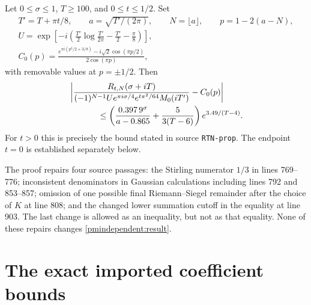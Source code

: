 \documentclass[11pt]{article}
\begin{document}
\begin{pmindependenttheorem}\label{pmindependent:main}
Let $0\le\sigma\le1$, $T\ge100$, and $0\le t\le1/2$. Set
\begin{gather*}
 T'=T+\pi t/8,\qquad a=\sqrt{T'/(2\pi)},\qquad N=\lfloor a\rfloor,
 \qquad p=1-2(a-N),\\
 U=\exp\!\left[-i\left(\frac{T'}2\log\frac{T'}{2\pi}
                   -\frac{T'}2-\frac\pi8\right)\right],\\
 C_0(p)=\frac{e^{\pi i(p^2/2+3/8)}-i\sqrt2\cos(\pi p/2)}{2\cos(\pi p)},
\end{gather*}
with removable values at $p=\pm1/2$. Then
\begin{align}\label{pmindependent:result}
 &\left|\frac{R_{t,N}(\sigma+iT)}
 {(-1)^{N-1}Ue^{\pi i\sigma/4}e^{t\pi^2/64}M_0(iT')}-C_0(p)\right|\\
 &\hspace{12mm}\le
 \left(\frac{0.397\,9^\sigma}{a-0.865}+\frac5{3(T-6)}\right)
                      e^{3.49/(T-4)}.\nonumber
\end{align}
For $t>0$ this is precisely the bound stated in source
\texttt{RTN-prop}. The endpoint $t=0$ is established separately below.
\end{pmindependenttheorem}

The proof repairs four source passages: the Stirling numerator $1/3$
in lines 769--776; inconsistent denominators in Gaussian calculations
including lines 792 and 853--857; omission of one possible final
Riemann--Siegel remainder after the choice of $K$ at line 808; and the
changed lower summation cutoff in the equality at line 903. The
last change is allowed as an inequality, but not as that equality.
None of these repairs changes \eqref{pmindependent:result}.

\section{The exact imported coefficient bounds}
\end{document}
